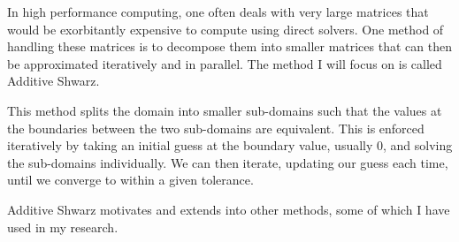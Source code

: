 In high performance computing, one often deals with very large matrices that would be exorbitantly expensive to compute using direct solvers. One method of handling these matrices is to decompose them into smaller matrices that can then be approximated iteratively and in parallel. The method I will focus on is called Additive Shwarz.
	
This method splits the domain into smaller sub-domains such that the values at the boundaries between the two sub-domains are equivalent. This is enforced iteratively by taking an initial guess at the boundary value, usually 0, and solving the sub-domains individually. We can then iterate, updating our guess each time, until we converge to within a given tolerance.

Additive Shwarz motivates and extends into other methods, some of which I have used in my research.
